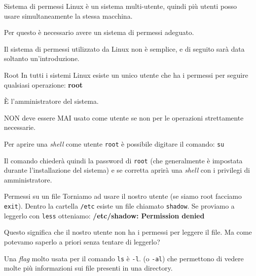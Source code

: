 \documentclass{beamer}
\begin{document}
\begin{frame}{Sistema di permessi}
  Linux è un sistema multi-utente, quindi più utenti posso usare simultaneamente la stessa macchina. \bigskip

  Per questo è necessario avere un sistema di permessi 
  adeguato.\bigskip

  Il sistema di permessi utilizzato da Linux non è semplice, e di seguito sarà data soltanto un'introduzione.\bigskip
\end{frame}

\begin{frame}{Root}
  In tutti i sistemi Linux esiste un unico utente che ha i permessi per seguire
  qualsiasi operazione: \textbf{root}\bigskip

  È l'amministratore del sistema.\bigskip

  NON deve essere MAI usato come utente se non per le operazioni strettamente
  necessarie.\bigskip

  Per aprire una \textit{shell} come utente \texttt{root} è possibile digitare
  il comando: \texttt{su}\bigskip

  Il comando chiederà quindi la password di \texttt{root} (che generalmente è
  impostata durante l'installazione del sistema) e se corretta aprirà una 
  \textit{shell} con i privilegi di amministratore.
\end{frame}

\begin{frame}{Permessi su un file}
  Torniamo ad usare il nostro utente (se siamo root facciamo \texttt{exit}). 
  Dentro la cartella \texttt{/etc} esiste un file chiamato \texttt{shadow}. 
  Se proviamo a leggerlo con \texttt{less} otteniamo: \textbf{/etc/shadow: 
  Permission denied}\bigskip

  Questo significa che il nostro utente non ha i permessi per leggere il file.
  Ma come potevamo saperlo a priori senza tentare di leggerlo?\bigskip

  Una \textit{flag} molto usata per il comando \texttt{ls} è 
  \texttt{-l}. (o \texttt{-al}) che permettono di vedere molte più informazioni 
  sui file presenti in una directory.
\end{frame}
\end{document}
